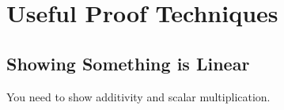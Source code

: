 \chapter{Useful Proof Techniques}

\section{Showing Something is Linear}

You need to show additivity and scalar multiplication.